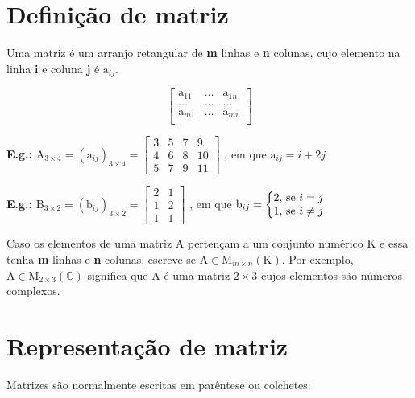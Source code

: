 \documentclass[a4paper,12pt]{article}
\begin{document}
\pagebreak

\section{Definição de matriz}

Uma matriz é um arranjo retangular de \textbf{m} linhas e \textbf{n} colunas, cujo elemento na linha \textbf{i} e coluna \textbf{j} é $ \text{a}_{ij} $.

$$ \begin{bmatrix}
\text{a}_{11}&\dots&\text{a}_{1n}\\
\dots&\dots&\dots\\
\text{a}_{m1}&\dots&\text{a}_{mn}\\
\end{bmatrix}\label{x} $$

\textbf{E.g.:} $ \text{A}_{3 \times 4} = (\text{a}_{ij})_{3 \times 4}  =  \begin{bmatrix}
3 & 5 & 7 & 9  \\
4 & 6 & 8 & 10 \\
5 & 7 & 9 & 11 
\end{bmatrix}$ , em que $ \text{a}_{ij} = i + 2j $

\textbf{E.g.:} $ \text{B}_{3 \times 2} = (\text{b}_{ij})_{3 \times 2} = \begin{bmatrix}
2 & 1\\ 
1 & 2\\ 
1 & 1
\end{bmatrix}$ , em que $ \text{b}_{ij} = 
\left\{\begin{matrix}
2\text{, se $ i=j $}\\ 
 1\text{, se $ i\neq j  $}&  
\end{matrix}\right. $

Caso os elementos de uma matriz A pertençam a um conjunto numérico K e essa tenha \textbf{m} linhas e \textbf{n} colunas, escreve-se $ \text{A} \in \text{M}_{m \times n} (\text{K})$.
Por exemplo, $ \text{A} \in \text{M}_{2 \times 3} (\mathbb{C}) $ significa que $ \text{A} $ é uma matriz $ 2 \times 3$ cujos elementos são números complexos. 

\section{Representação de matriz}

Matrizes são normalmente escritas em parêntese ou colchetes:
\end{document}
